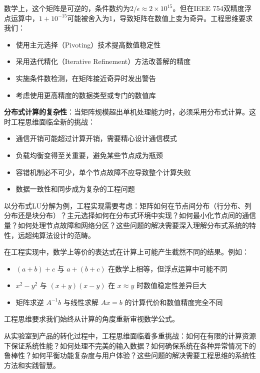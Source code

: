 数学上，这个矩阵是可逆的，条件数约为$2/\epsilon \approx 2 \times 10^{15}$。但在IEEE 754双精度浮点运算中，$1 + 10^{-15}$可能被舍入为1，导致矩阵在数值上变为奇异。工程思维要求我们：
\begin{itemize}
\item 使用主元选择（Pivoting）技术提高数值稳定性
\item 采用迭代精化（Iterative Refinement）方法改善解的精度
\item 实施条件数检测，在矩阵接近奇异时发出警告
\item 考虑使用更高精度的数据类型或专门的数值库
\end{itemize}

\textbf{分布式计算的复杂性}：当矩阵规模超出单机处理能力时，必须采用分布式计算。这时工程思维面临全新的挑战：
\begin{itemize}
\item 通信开销可能超过计算开销，需要精心设计通信模式
\item 负载均衡变得至关重要，避免某些节点成为瓶颈
\item 容错机制必不可少，单个节点故障不应导致整个计算失败
\item 数据一致性和同步成为复杂的工程问题
\end{itemize}

以分布式LU分解为例，工程实现需要考虑：矩阵如何在节点间分布（行分布、列分布还是块分布）？主元选择如何在分布式环境中实现？如何最小化节点间的通信量？如何处理节点故障和网络分区？这些问题的解决需要深入理解分布式系统的特性，远超纯算法设计的范畴。

\begin{tcolorbox}[colback=red!5!white,colframe=red!75!black,title=警示：数学等价≠计算等价]
在工程实现中，数学上等价的表达式在计算上可能产生截然不同的结果。例如：
\begin{itemize}
\item $(a+b)+c$ 与 $a+(b+c)$ 在数学上相等，但浮点运算中可能不同
\item $x^2-y^2$ 与 $(x+y)(x-y)$ 在 $x \approx y$ 时数值稳定性差异巨大
\item 矩阵求逆 $A^{-1}b$ 与线性求解 $Ax=b$ 的计算代价和数值精度完全不同
\end{itemize}
工程思维要求我们始终从计算的角度重新审视数学公式。
\end{tcolorbox}

从实验室到产品的转化过程中，工程思维面临着多重挑战：如何在有限的计算资源下保证系统性能？如何处理不完美的输入数据？如何确保系统在各种异常情况下的鲁棒性？如何平衡功能复杂度与用户体验？这些问题的解决需要工程思维的系统性方法和实践智慧。

